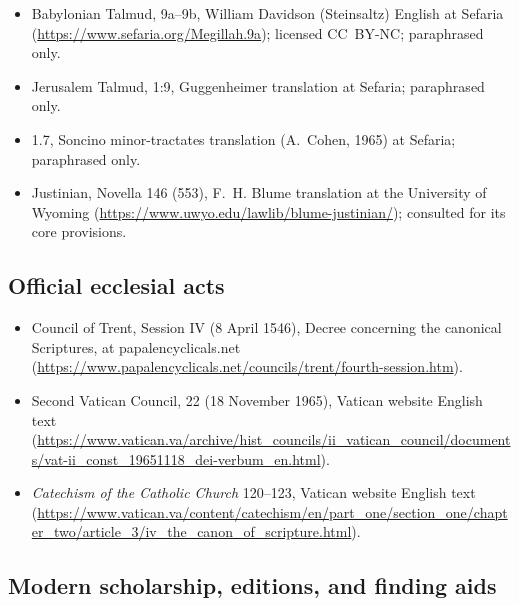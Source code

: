 \begin{itemize}
\item Babylonian Talmud,  9a--9b, William Davidson
(Steinsaltz) English at Sefaria
(\url{https://www.sefaria.org/Megillah.9a}); licensed CC~BY-NC;
paraphrased only.
\item Jerusalem Talmud,  1:9, Guggenheimer translation at
Sefaria; paraphrased only.
\item {} 1.7, Soncino minor-tractates translation
(A.~Cohen, 1965) at Sefaria; paraphrased only.
\item Justinian, Novella 146  (553), F.~H. Blume
translation at the University of Wyoming
(\url{https://www.uwyo.edu/lawlib/blume-justinian/}); consulted for its
core provisions.
\end{itemize}

\subsection*{Official ecclesial acts}

\begin{itemize}
\item Council of Trent, Session IV (8 April 1546), Decree concerning the
canonical Scriptures, at papalencyclicals.net
(\url{https://www.papalencyclicals.net/councils/trent/fourth-session.htm}).
\item Second Vatican Council,  22 (18 November 1965),
Vatican website English text
(\url{https://www.vatican.va/archive/hist_councils/ii_vatican_council/documents/vat-ii_const_19651118_dei-verbum_en.html}).
\item \textit{Catechism of the Catholic Church} 120--123, Vatican website
English text
(\url{https://www.vatican.va/content/catechism/en/part_one/section_one/chapter_two/article_3/iv_the_canon_of_scripture.html}).
\end{itemize}

\subsection*{Modern scholarship, editions, and finding aids}

